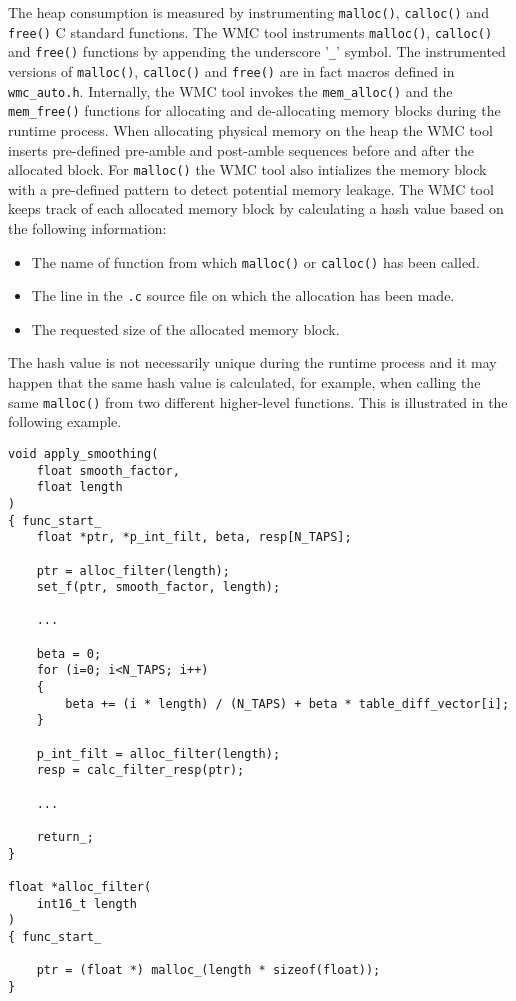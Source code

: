 The heap consumption is measured by instrumenting \verb|malloc()|, \verb|calloc()| and \verb|free()| C standard functions. The WMC tool instruments \verb|malloc()|, \verb|calloc()| and \verb|free()| functions by appending the underscore '\verb|_|' symbol. The instrumented versions of \verb|malloc()|, \verb|calloc()| and \verb|free()| are in fact macros defined in \verb|wmc_auto.h|. Internally, the WMC tool invokes the \verb|mem_alloc()| and the \verb|mem_free()| functions for allocating and de-allocating memory blocks during the runtime process. When allocating physical memory on the heap the WMC tool inserts pre-defined pre-amble and post-amble sequences before and after the allocated block. For \verb|malloc()| the WMC tool also intializes the memory block with a pre-defined pattern to detect potential memory leakage. The WMC tool keeps track of each allocated memory block by calculating a hash value based on the following information:

\begin{itemize}
  \item The name of function from which \verb|malloc()| or \verb|calloc()| has been called.
  \item The line in the \verb|.c| source file on which the allocation has been made.
  \item The requested size of the allocated memory block.
\end{itemize}

The hash value is not necessarily unique during the runtime process and it may happen that the same hash value is calculated, for example, when calling the same \verb|malloc()| from two different higher-level functions. This is illustrated in the following example.

\begin{Verbatim}[fontsize=\small]
void apply_smoothing(
    float smooth_factor,
    float length
)
{ func_start_
    float *ptr, *p_int_filt, beta, resp[N_TAPS];

    ptr = alloc_filter(length);
    set_f(ptr, smooth_factor, length);

    ...

    beta = 0;
    for (i=0; i<N_TAPS; i++)
    {
        beta += (i * length) / (N_TAPS) + beta * table_diff_vector[i];
    }

    p_int_filt = alloc_filter(length);
    resp = calc_filter_resp(ptr);

    ...

    return_;
}

float *alloc_filter(
    int16_t length
)
{ func_start_

    ptr = (float *) malloc_(length * sizeof(float));
}
\end{Verbatim}

